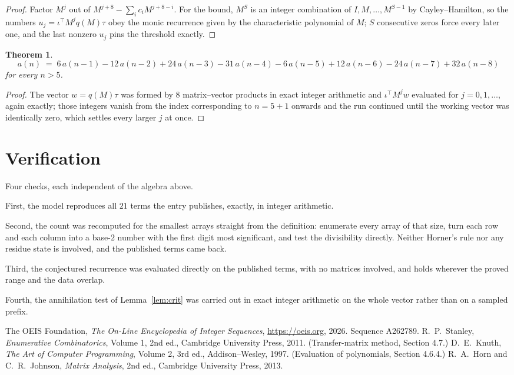 \documentclass[11pt,a4paper]{article}
\theoremstyle{plain}
\newtheorem{theorem}{Theorem}
\theoremstyle{definition}
\begin{document}
\begin{proof}
Factor $M^{j}$ out of $M^{j+8}-\sum_ic_iM^{j+8-i}$. For the bound, $M^{S}$
is an integer combination of $I,M,\dots,M^{S-1}$ by Cayley--Hamilton, so the numbers
$u_j=\iota^{\!\top}M^{j}q(M)\tau$ obey the monic recurrence given by the characteristic
polynomial of $M$; $S$ consecutive zeros force every later one, and the last nonzero $u_j$
pins the threshold exactly.
\end{proof}

\begin{theorem}
\[
a(n)\;=\;6\,a(n-1) - 12\,a(n-2) + 24\,a(n-3) - 31\,a(n-4) - 6\,a(n-5) + 12\,a(n-6) - 24\,a(n-7) + 32\,a(n-8)
\]
for every $n>5$.
\end{theorem}

\begin{proof}
The vector $w=q(M)\tau$ was formed by $8$ matrix--vector products in exact integer
arithmetic and $\iota^{\!\top}M^{j}w$ evaluated for $j=0,1,\dots$, again exactly; those
integers vanish from the index corresponding to $n=5+1$ onwards and the run continued
until the working vector was identically zero, which settles every larger $j$ at once.
\end{proof}

\section{Verification}

Four checks, each independent of the algebra above.

First, the model reproduces all $21$ terms the entry publishes, exactly, in integer
arithmetic.

Second, the count was recomputed for the smallest arrays straight from the definition:
enumerate every array of that size, turn each row and each column into a base-$2$ number with
the first digit most significant, and test the divisibility directly. Neither Horner's rule nor
any residue state is involved, and the published terms came back.

Third, the conjectured recurrence was evaluated directly on the published terms, with no
matrices involved, and holds wherever the proved range and the data overlap.

Fourth, the annihilation test of Lemma~\ref{lem:crit} was carried out in exact integer
arithmetic on the whole vector rather than on a sampled prefix.

\begin{thebibliography}{9}
 The OEIS Foundation, \emph{The On-Line Encyclopedia of Integer
Sequences}, \url{https://oeis.org}, 2026. Sequence A262789.
 R.~P.~Stanley, \emph{Enumerative Combinatorics}, Volume 1, 2nd ed.,
Cambridge University Press, 2011. (Transfer-matrix method, Section 4.7.)
 D.~E.~Knuth, \emph{The Art of Computer Programming}, Volume 2, 3rd ed.,
Addison--Wesley, 1997. (Evaluation of polynomials, Section 4.6.4.)
 R.~A.~Horn and C.~R.~Johnson, \emph{Matrix Analysis}, 2nd ed., Cambridge
University Press, 2013.
\end{thebibliography}
\end{document}

